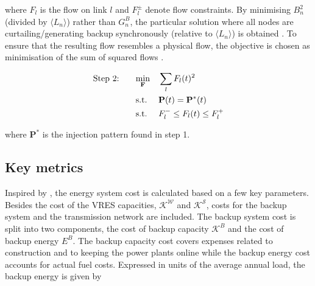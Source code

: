 \documentclass[a4paper, 5p, sort&compress]{elsarticle}%
\newcommand{\mean}[1]{\langle #1 \rangle}
\begin{document}
where $F_{l}$ is the flow on link $l$ and $F_{l}^{\pm}$ denote flow
constraints. By minimising $B_{n}^{2}$ (divided by $\mean{L_{n}}$)
rather than $G_{n}^{B}$, the particular solution where all nodes are
curtailing/generating backup synchronously (relative to
$\mean{L_{n}}$) is obtained
\cite{Rolando2015}. %
To ensure that the resulting flow resembles a physical flow, the
objective is chosen as minimisation of the sum of squared flows
\cite{Magnus}.

\begin{equation}
  \begin{aligned}
    \label{eq:step2}
    \text{Step 2: \hspace{15pt}} & \underset{\mathbf{F}}{\text{min}}
    & & \sum_{l} F_{l}(t)^{2} \\
    & \text{s.t.}
    & & \mathbf{P}(t) = \mathbf{P}^{*}(t) \\ %
    & \text{s.t.}
    & & F_{l}^{-} \leq F_{l}(t) \leq F_{l}^{+} \\
  \end{aligned}
\end{equation}

where $\mathbf{P}^{*}$ is the injection pattern found in step 1.


\subsection{Key metrics}

Inspired by \cite{Sensitivity}, the energy system cost is calculated
based on a few key parameters. Besides the cost of the VRES
capacities, $\mathcal{K^{W}}$ and $\mathcal{K^S}$, costs for the
backup system and the transmission network are included. The backup
system cost is split into two components, the cost of backup capacity
$\mathcal{K}^{B}$ and the cost of backup energy $E^{B}$. The backup
capacity cost covers expenses related to construction and to keeping
the power plants online while the backup energy cost accounts for
actual fuel costs. Expressed in units of the average annual load, the
backup energy is given by
\end{document}
